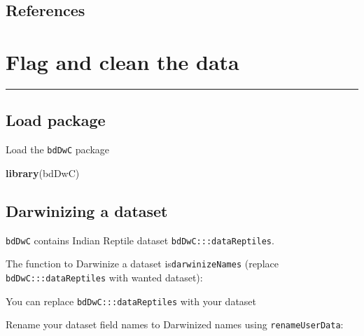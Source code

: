 \documentclass[]{book}
\newenvironment{Shaded}{\begin{snugshade}}{\end{snugshade}}
\newcommand{\KeywordTok}[1]{\textcolor[rgb]{0.13,0.29,0.53}{\textbf{#1}}}
\newcommand{\DataTypeTok}[1]{\textcolor[rgb]{0.13,0.29,0.53}{#1}}
\newcommand{\StringTok}[1]{\textcolor[rgb]{0.31,0.60,0.02}{#1}}
\newcommand{\OperatorTok}[1]{\textcolor[rgb]{0.81,0.36,0.00}{\textbf{#1}}}
\newcommand{\NormalTok}[1]{#1}
\begin{document}
\section{References}\label{references}

\chapter{Flag and clean the data}\label{flag-and-clean-the-data}

\begin{center}\rule{0.5\linewidth}{\linethickness}\end{center}

\section{Load package}\label{load-package-1}

Load the \texttt{bdDwC} package

\begin{Shaded}
\begin{Highlighting}[]
    \KeywordTok{library}\NormalTok{(bdDwC)}
\end{Highlighting}
\end{Shaded}

\section{Darwinizing a dataset}\label{darwinizing-a-dataset-1}

\texttt{bdDwC} contains Indian Reptile dataset
\texttt{bdDwC:::dataReptiles}.

The function to Darwinize a dataset is\texttt{darwinizeNames} (replace
\texttt{bdDwC:::dataReptiles} with wanted dataset):

\begin{Shaded}
\end{Shaded}

You can replace \texttt{bdDwC:::dataReptiles} with your dataset

Rename your dataset field names to Darwinized names using
\texttt{renameUserData}:
\end{document}
